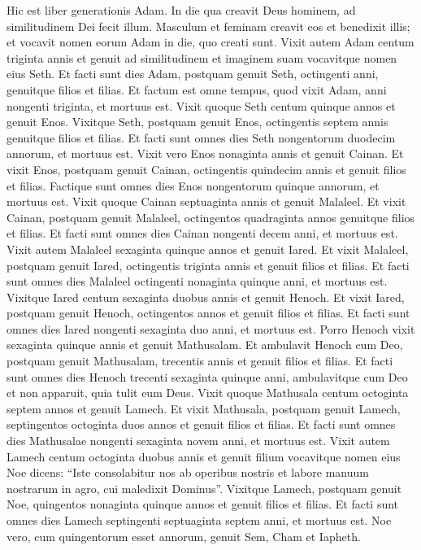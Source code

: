 \begin{biblechapter}  
\verse Hic est liber generationis Adam. In die qua creavit Deus hominem, ad similitudinem Dei fecit illum. 
\verse Masculum et feminam creavit eos et benedixit illis; et vocavit nomen eorum Adam in die, quo creati sunt. 
\verse Vixit autem Adam centum triginta annis et genuit ad similitudinem et imaginem suam vocavitque nomen eius Seth. 
\verse Et facti sunt dies Adam, postquam genuit Seth, octingenti anni, genuitque filios et filias. 
\verse Et factum est omne tempus, quod vixit Adam, anni nongenti triginta, et mortuus est. 
\verse Vixit quoque Seth centum quinque annos et genuit Enos. 
\verse Vixitque Seth, postquam genuit Enos, octingentis septem annis genuitque filios et filias. 
\verse Et facti sunt omnes dies Seth nongentorum duodecim annorum, et mortuus est. 
\verse Vixit vero Enos nonaginta annis et genuit Cainan. 
\verse Et vixit Enos, postquam genuit Cainan, octingentis quindecim annis et genuit filios et filias.  
\verse Factique sunt omnes dies Enos nongentorum quinque annorum, et mortuus est. 
\verse Vixit quoque Cainan septuaginta annis et genuit Malaleel. 
\verse Et vixit Cainan, postquam genuit Malaleel, octingentos quadraginta annos genuitque filios et filias. 
\verse Et facti sunt omnes dies Cainan nongenti decem anni, et mortuus est. 
\verse Vixit autem Malaleel sexaginta quinque annos et genuit Iared. 
\verse Et vixit Malaleel, postquam genuit Iared, octingentis triginta annis et genuit filios et filias. 
\verse Et facti sunt omnes dies Malaleel octingenti nonaginta quinque anni, et mortuus est. 
\verse Vixitque Iared centum sexaginta duobus annis et genuit Henoch. 
\verse Et vixit Iared, postquam genuit Henoch, octingentos annos et genuit filios et filias. 
\verse Et facti sunt omnes dies Iared nongenti sexaginta duo anni, et mortuus est. 
\verse Porro Henoch vixit sexaginta quinque annis et genuit Mathusalam. 
\verse Et ambulavit Henoch cum Deo, postquam genuit Mathusalam, trecentis annis et genuit filios et filias. 
\verse Et facti sunt omnes dies Henoch trecenti sexaginta quinque anni, 
\verse ambulavitque cum Deo et non apparuit, quia tulit eum Deus. 
\verse Vixit quoque Mathusala centum octoginta septem annos et genuit Lamech. 
\verse Et vixit Mathusala, postquam genuit Lamech, septingentos octoginta duos annos et genuit filios et filias. 
\verse Et facti sunt omnes dies Mathusalae nongenti sexaginta novem anni, et mortuus est. 
\verse Vixit autem Lamech centum octoginta duobus annis et genuit filium 
\verse vocavitque nomen eius Noe dicens: “Iste consolabitur nos ab operibus nostris et labore manuum nostrarum in agro, cui maledixit Dominus”. 
\verse Vixitque Lamech, postquam genuit Noe, quingentos nonaginta quinque annos et genuit filios et filias. 
\verse Et facti sunt omnes dies Lamech septingenti septuaginta septem anni, et mortuus est. 
\verse Noe vero, cum quingentorum esset annorum, genuit Sem, Cham et Iapheth. 
\end{biblechapter}

